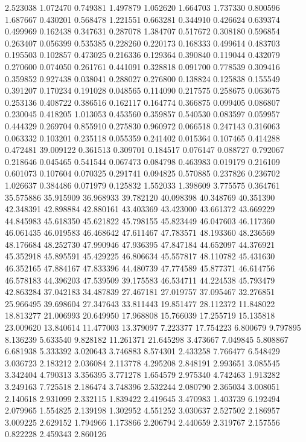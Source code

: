 2.523038
1.072470
0.749381
1.497879
1.052620
1.664703
1.737330
0.800596
1.687667
0.430201
0.568478
1.221551
0.663281
0.344910
0.426624
0.639374
0.499969
0.162438
0.347631
0.287078
1.384707
0.517672
0.308180
0.596854
0.263407
0.056399
0.535385
0.228260
0.220173
0.168333
0.499614
0.483703
0.195503
0.102857
0.473025
0.216336
0.129364
0.390840
0.119044
0.432079
0.270600
0.074050
0.261761
0.441091
0.328818
0.091700
0.778539
0.309416
0.359852
0.927438
0.038041
0.288027
0.276800
0.138824
0.125838
0.155549
0.391207
0.170234
0.191028
0.048565
0.114090
0.217575
0.258675
0.063675
0.253136
0.408722
0.386516
0.162117
0.164774
0.366875
0.099405
0.086807
0.230045
0.418205
1.013053
0.453560
0.359857
0.540530
0.083597
0.059957
0.444329
0.269704
0.855910
0.275830
0.960972
0.066518
0.247143
0.316063
0.063332
0.103201
0.235118
0.055359
0.241402
0.015364
0.107465
0.414288
0.472481
39.009122
0.361513
0.309701
0.184517
0.076147
0.088727
0.792067
0.218646
0.045465
0.541544
0.067473
0.084798
0.463983
0.019179
0.216109
0.601073
0.107604
0.070325
0.291741
0.094825
0.570885
0.237826
0.236702
1.026637
0.384486
0.071979
0.125832
1.552033
1.398609
3.775575
0.364761
35.575886
35.915909
36.968933
39.782120
40.098398
40.348769
40.351390
42.348391
42.898884
42.880161
43.403369
43.423000
43.661372
43.669229
44.845983
45.618350
45.621822
45.798155
45.823449
46.047603
46.117360
46.061435
46.019583
46.468642
47.611467
47.783571
48.193360
48.236569
48.176684
48.252730
47.990946
47.936395
47.847184
44.652097
44.376921
45.352918
45.895591
45.429225
46.806634
45.557817
48.110782
45.431630
46.352165
47.884167
47.833396
44.480739
47.774589
45.877371
46.614756
46.578183
44.396203
47.539509
39.175583
46.534711
44.224538
45.793479
42.863284
37.042183
34.487839
27.467181
27.019757
37.095467
32.276851
25.966495
39.698604
27.347643
33.811443
19.851477
28.112372
11.848022
18.813277
21.006993
20.649950
17.968808
15.766039
17.255719
15.135818
23.009620
13.840614
11.477003
13.379097
7.223377
17.754223
6.800679
9.797895
8.136239
5.633540
9.828182
11.261371
21.645298
3.473667
7.049845
5.808867
6.681938
5.333392
3.020643
3.746883
8.574301
2.433258
7.766477
6.548429
3.036723
2.183212
2.036084
2.113778
4.295208
2.848191
2.993651
3.085545
3.342404
4.790313
3.356395
3.771278
1.654579
2.975340
4.742463
1.913282
3.249163
7.725518
2.186474
3.748396
2.532244
2.080790
2.365034
3.008051
2.140618
2.931099
2.332115
1.839422
2.419645
3.470983
1.403739
6.192494
2.079965
1.554825
2.139198
1.302952
4.551252
3.030637
2.527502
2.186957
3.009225
2.629152
1.794966
1.173866
2.206794
2.440659
2.319767
2.157556
0.822228
2.459343
2.860126
